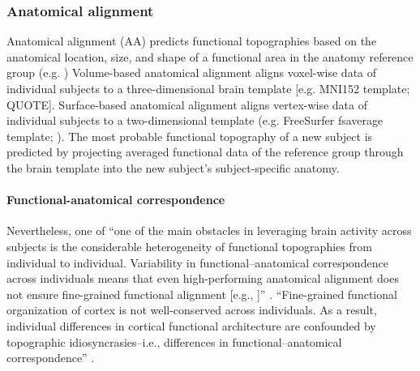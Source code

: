 \subsubsection{Anatomical alignment}




Anatomical alignment (AA) predicts functional topographies based on the
anatomical location, size, and shape of a functional area in the anatomy
reference group (e.g. \citet{weiner2018defining})
Volume-based anatomical alignment \citep{evans19933d} aligns voxel-wise data of
individual subjects to a three-dimensional brain template [e.g. MNI152 template;
QUOTE].
Surface-based anatomical alignment \citep{fischl1999cortical}  aligns
vertex-wise data of individual subjects to a two-dimensional template (e.g.
FreeSurfer fsaverage template; \citep{fischl1999high}).
%
The most probable functional topography of a new subject is predicted by
projecting averaged functional data of the reference group through the brain
template into the new subject's subject-specific anatomy.


\paragraph{Functional-anatomical correspondence}

%
Nevertheless, one of ``one of the main obstacles in leveraging brain activity
across subjects is the considerable heterogeneity of functional topographies
from individual to individual. Variability in functional--anatomical
correspondence across individuals means that even high-performing anatomical
alignment does not ensure fine-grained functional alignment [e.g.,
\citet{frost2012measuring}]'' \citep{kumar2020brainiak}.
%
``Fine-grained functional organization of cortex is not well-conserved across
individuals. As a result, individual differences in cortical functional
architecture are confounded by topographic idiosyncrasies--i.e., differences in
functional–anatomical correspondence'' \citep{feilong2018reliable}.

